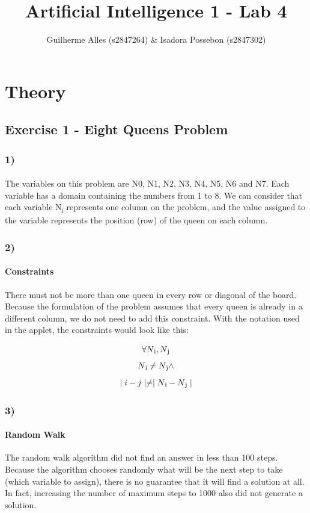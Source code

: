 \documentclass{article}
\title{Artificial Intelligence 1 - Lab 4}
\author{Guilherme Alles (s2847264) \& Isadora Possebon (s2847302)}
\begin{document}
\maketitle

\section*{Theory}
\subsection*{Exercise 1 - Eight Queens Problem}
\subsubsection*{1)}
\paragraph{} The variables on this problem are N0, N1, N2, N3, N4, N5, N6 and N7. Each variable has a domain containing the numbers from 1 to 8. We can consider that each variable N\textsubscript{i} represents one column on the problem, and the value assigned to the variable represents the position (row) of the queen on each column.

\subsubsection*{2)}
\paragraph{Constraints} There must not be more than one queen in every row or diagonal of the board. Because the formulation of the problem assumes that every queen is already in a different column, we do not need to add this constraint. With the notation used in the applet, the constraints would look like this:

\[\forall N\textsubscript{i}, N\textsubscript{j}\]
\[N\textsubscript{i} \neq N\textsubscript{j} \land\]
\[\mid i - j\mid  \neq  \mid N\textsubscript{i} - N\textsubscript{j}\mid\]

\subsubsection*{3)}
\paragraph{Random Walk} The random walk algorithm did not find an answer in less than 100 steps. Because the algorithm chooses randomly what will be the next step to take (which variable to assign), there is no guarantee that it will find a solution at all. In fact, increasing the number of maximum steps to 1000 also did not generate a solution.
\end{document}
